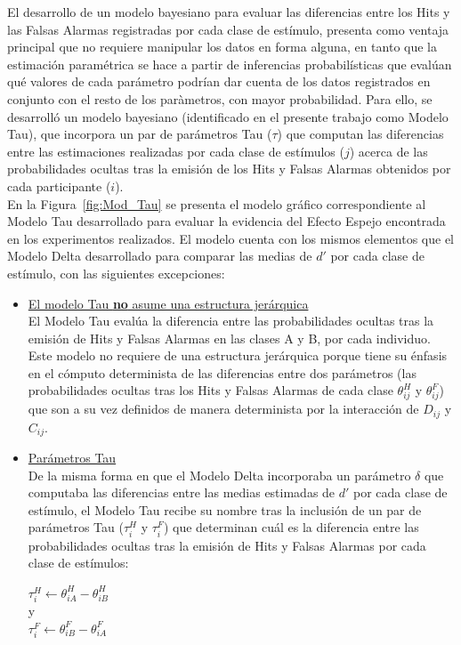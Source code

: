 El desarrollo de un modelo bayesiano para evaluar las diferencias entre los Hits y las Falsas Alarmas registradas por cada clase de estímulo, presenta como ventaja principal que no requiere manipular los datos en forma alguna, en tanto que la estimación paramétrica se hace a partir de inferencias probabilísticas que evalúan qué valores de cada parámetro podrían dar cuenta de los datos registrados en conjunto con el resto de los paràmetros, con mayor probabilidad. Para ello, se desarrolló un modelo bayesiano (identificado en el presente trabajo como Modelo Tau), que incorpora un par de parámetros Tau ($\tau$) que computan las diferencias entre las estimaciones realizadas por cada clase de estímulos ($j$) acerca de las probabilidades ocultas tras la emisión de los Hits y Falsas Alarmas obtenidos por cada participante ($i$).\\ 

En la Figura~\ref{fig:Mod_Tau} se presenta el modelo gráfico correspondiente al Modelo Tau desarrollado para evaluar la evidencia del Efecto Espejo encontrada en los experimentos realizados. El modelo cuenta con los mismos elementos que el Modelo Delta desarrollado para comparar las medias de $d'$ por cada clase de estímulo, con las siguientes excepciones:\\

\begin{itemize}
\item \underline{El modelo Tau \textbf{no} asume una estructura jerárquica}\\

El Modelo Tau evalúa la diferencia entre las probabilidades ocultas tras la emisión de Hits y Falsas Alarmas en las clases A y B, por cada individuo. Este modelo no requiere de una estructura jerárquica porque tiene su énfasis en el cómputo determinista de las diferencias entre dos parámetros (las probabilidades ocultas tras los Hits y Falsas Alarmas de cada clase $\theta^H_{ij}$ y $\theta^F_{ij}$) que son a su vez definidos de manera determinista por la interacción de $D_{ij}$ y $C_{ij}$.\\

\item \underline{Parámetros Tau}\\

De la misma forma en que el Modelo Delta incorporaba un parámetro $\delta$ que computaba las diferencias entre las medias estimadas de $d'$ por cada clase de estímulo, el Modelo Tau recibe su nombre tras la inclusión de un par de parámetros Tau ($\tau^H_{i}$ y $\tau^F_{i}$) que determinan cuál es la diferencia entre las probabilidades ocultas tras la emisión de Hits y Falsas Alarmas por cada clase de estímulos:\\

\begin{center}
$\tau^H_{i}\gets \theta^H_{iA}-\theta^H_{iB}$\\
y\\
$\tau^F_{i}\gets \theta^F_{iB}-\theta^F_{iA}$\\
\end{center}

\end{itemize}

